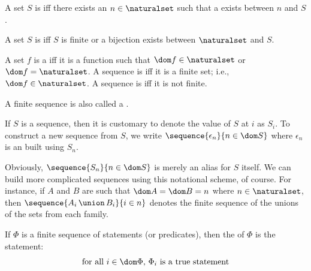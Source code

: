 \begin{dfn}
     \label{dfn:metatheory-finite-set}
    A set \( S \) is  iff there exists an \( n \in \naturalset \) such that a  exists
    between \( n \) and \( S \).
\end{dfn}

\begin{dfn}
     \label{dfn:metatheory-countable-set}
    A set \( S \) is  iff \( S \) is finite or a bijection exists between \( \naturalset \) and \( S \).
\end{dfn}

\begin{dfn}[Sequence]
     \label{dfn:metatheory-sequence}
    A set \( f \) is a  iff it is a function such that \( \dom f \in \naturalset \) or \( \dom f = \naturalset \).
    A sequence is  iff it is a finite set; i.e., \( \dom f \in \naturalset \).
    A sequence is  iff it is not finite.
\end{dfn}

\begin{dfn}[Tuple]
     \label{dfn:metatheory-tuple}
    A finite sequence is also called a .
\end{dfn}

\begin{notation}
    If \( S \) is a sequence, then it is customary to denote the value of \( S \) at \( i \) as \( S_{i} \).
    To construct a new sequence from \( S \), we write \( \sequence{\epsilon_{n}}{n \in \dom S} \) where \( \epsilon_{n} \)
    is an  built using \( S_{n} \).
\end{notation}

\begin{eg}
    Obviously, \( \sequence{S_{n}}{n \in \dom S} \) is merely an alias for \( S \) itself.
    We can build more complicated sequences using this notational scheme, of course.
    For instance, if \( A \) and \( B \) are  such that
    \( \dom A = \dom B = n \) where \( n \in \naturalset \), then
    \( \sequence{A_{i} \,{\union}\, B_{i}}{i \in n} \) denotes the finite sequence of the unions of the sets from each family.
\end{eg}

\begin{dfn}
     \label{dfn:metatheory-generalized-conjunction}
    If \( \Phi \) is a finite sequence of statements (or predicates), then the  of \( \Phi \)
    is the statement:
    \begin{equation*}
        \text{for all \( i \in \dom \Phi \), \( \Phi_{i} \) is a true statement}
    \end{equation*}
\end{dfn}

